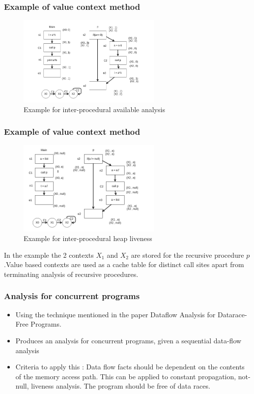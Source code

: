 \documentclass{beamer}
\begin{document}
  \begin{frame}
  	\frametitle{Example of value context method}
  	\begin{figure}[here]
  		\begin{center}
  			\includegraphics[width=7cm]{Figures/avbl_exp_interproc.png}
  		\end{center}
  		\caption{Example for inter-procedural available analysis}
  		\label{fig:extreme}
  	\end{figure}
  \end{frame}
  
  \begin{frame}
  \frametitle{Example of value context method}
\begin{figure}[here]
\begin{center}
\includegraphics[width=7cm]{Figures/interproc_example.png}
\end{center}
\caption{Example for inter-procedural heap liveness}
\label{fig:extreme}
\end{figure}
	
	In the example the 2 contexts $X_1$ and $X_2$ are stored for the recursive procedure $p$.Value based contexts are used as a cache table for distinct call sites apart from terminating analysis of recursive procedures.
	
	

  \end{frame}
  
  \begin{frame}
  \frametitle{Analysis for concurrent programs}
  
  \begin{itemize}
  	\item Using the technique mentioned in the paper Dataflow Analysis for Datarace-Free Programs.
  	\item Produces an analysis for concurrent programs, given a sequential data-flow analysis
  	\item Criteria to apply this : Data flow facts should be dependent on the contents of the memory access path. This can be applied to constant propagation, not-null, liveness analysis. The program should be free of data races. 
  \end{itemize}
  
  \end{frame}
  
\end{document}

